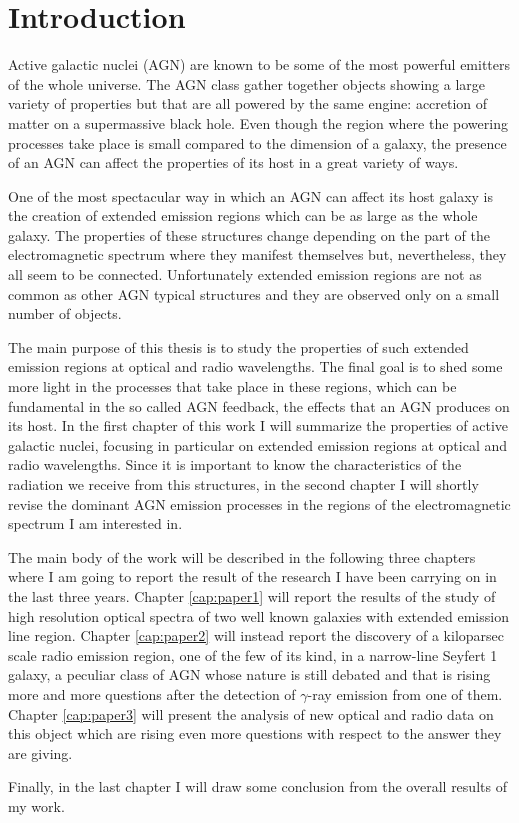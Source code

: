\documentclass[../thesis.tex]{subfiles}
\begin{document}
\chapter{Introduction}
\label{cap:intro}

Active galactic nuclei (AGN) are known to be some of the most powerful emitters of the whole universe.
The AGN class gather together objects showing a large variety of properties but that are all powered by the same engine: accretion of matter on a supermassive black hole.
Even though the region where the powering processes take place is small compared to the dimension of a galaxy, the presence of an AGN can affect the properties of its host in a great variety of ways.

One of the most spectacular way in which an AGN can affect its host galaxy is the creation of extended emission regions which can be as large as the whole galaxy.
The properties of these structures change depending on the part of the electromagnetic spectrum where they manifest themselves but, nevertheless, they all seem to be connected.
Unfortunately extended emission regions are not as common as other AGN typical structures and they are observed only on a small number of objects.

The main purpose of this thesis is to study the properties of such extended emission regions at optical and radio wavelengths.
The final goal is to shed some more light in the processes that take place in these regions, which can be fundamental in the so called AGN feedback, the effects that an AGN produces on its host.
In the first chapter of this work I will summarize the properties of active galactic nuclei, focusing in particular on extended emission regions at optical and radio wavelengths.
Since it is important to know the characteristics of the radiation we receive from this structures, in the second chapter I will shortly revise the dominant AGN emission processes in the regions of the electromagnetic spectrum I am interested in.

The main body of the work will be described in the following three chapters where I am going to report the result of the research I have been carrying on in the last three years.
Chapter \ref{cap:paper1} will report the results of the study of high resolution optical spectra of two well known galaxies with extended emission line region.
Chapter \ref{cap:paper2} will instead report the discovery of a kiloparsec scale radio emission region, one of the few of its kind, in a narrow-line Seyfert 1 galaxy, a peculiar class of AGN whose nature is still debated and that is rising more and more questions after the detection of $\gamma$-ray emission from one of them.
Chapter \ref{cap:paper3} will present the analysis of new optical and radio data on this object which are rising even more questions with respect to the answer they are giving.

Finally, in the last chapter I will draw some conclusion from the overall results of my work.

\biblio
\end{document}
